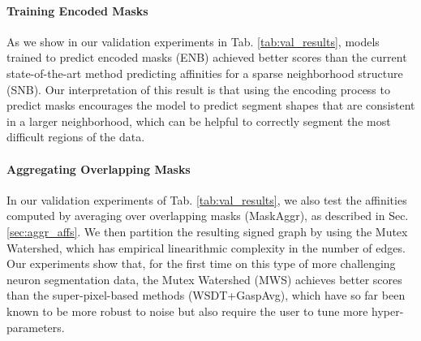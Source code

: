 


\paragraph{Training Encoded Masks} As we show in our validation experiments in Tab. \ref{tab:val_results}, models trained to predict encoded \maskname masks (ENB) achieved better scores than the current state-of-the-art method predicting affinities for a sparse neighborhood structure (SNB). 
Our interpretation of this result is that using the encoding process to predict \maskname masks encourages the model to predict segment shapes that are consistent in a larger neighborhood, which can be helpful to correctly segment the most difficult regions of the data. 



\paragraph{Aggregating Overlapping Masks}
In our validation experiments of Tab. \ref{tab:val_results}, we also test the affinities computed by averaging over overlapping masks (MaskAggr), as described in Sec. \ref{sec:aggr_affs}. We then partition the resulting signed graph by using the Mutex Watershed, which has empirical linearithmic complexity in the number of edges. 
Our experiments show that, for the first time on this type of more challenging neuron segmentation data, the Mutex Watershed (MWS) achieves better scores than the super-pixel-based methods (WSDT+GaspAvg), which have so far been known to be more robust to noise but also require the user to tune more hyper-parameters.   

